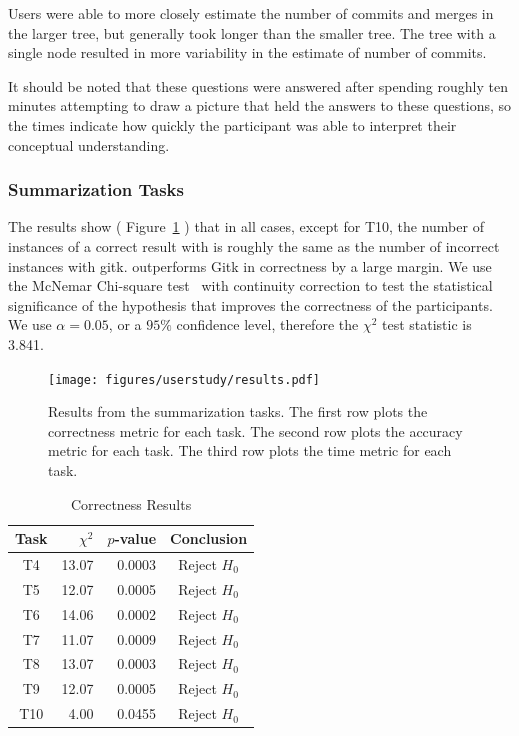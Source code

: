Users were able to more closely estimate the number of commits and
merges in the larger tree, but generally took longer than the smaller
tree. The tree with a single node resulted in more variability in the
estimate of number of commits.

It should be noted that these questions were answered after spending
roughly ten minutes attempting to draw a picture that held the answers
to these questions, so the times indicate how quickly the participant
was able to interpret their conceptual understanding.

\subsubsection{Summarization Tasks}
\label{sub:summarization_tasks}


The results show ( Figure~\ref{fig:summarization_results} ) that in all
cases, except for T10, the number of instances of a correct result with
\tool is roughly the same as the number of incorrect instances with
gitk. \tool outperforms Gitk in correctness by a large margin. We use
the McNemar Chi-square test~\cite{McNemar1947} with continuity
correction to test the statistical significance of the hypothesis that
\tool improves the correctness of the participants. We use $\alpha =
0.05$, or a $95\%$ confidence level, therefore the $\chi^2$ test
statistic is 3.841.


\begin{figure}[htpb]
  \centering
  \texttt{[image: figures/userstudy/results.pdf]}
  \caption{Results from the summarization tasks. The first row plots the
    correctness metric for each task. The second row plots the
    accuracy metric for each task. The third row plots the time metric
    for each task.}
  \label{fig:summarization_results}
\end{figure}

\begin{table}[htpb]
  \centering
  \caption{Correctness Results}
  \label{tab:correctness_table}
  \begin{tabular}{crrc}
    \toprule
    Task & $\chi^2$ & $p$-value & Conclusion\\\midrule
    T4   & 13.07    & 0.0003    & Reject $H_0$\\
    T5   & 12.07    & 0.0005    & Reject $H_0$\\
    T6   & 14.06    & 0.0002    & Reject $H_0$\\
    T7   & 11.07    & 0.0009    & Reject $H_0$\\
    T8   & 13.07    & 0.0003    & Reject $H_0$\\
    T9   & 12.07    & 0.0005    & Reject $H_0$\\
    T10  & 4.00     & 0.0455    & Reject $H_0$\\
    \bottomrule
  \end{tabular}
\end{table}

